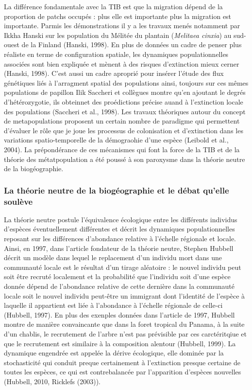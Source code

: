La différence fondamentale avec la TIB est que la migration dépend de la
proportion de patchs occupés : plus elle est importante plus la
migration est importante. Parmis les démonstrations il y a les travaux
menés notamment par Ikkha Hanski sur les population du Mélitée du
plantain (\emph{Melitaea cinxia}) au sud-ouest de la Finland (Hanski,
1998). En plus de données un cadre de penser plus réaliste en terme de
configuration spatiale, les dynamiques populationnelles associées sont
bien expliquée et mènent à des risques d'extinction mieux cerner
(Hanski, 1998). C'est aussi un cadre aproprié pour insérer l'étude des
flux génétiques liés à l'arragment spatial des populations ainsi,
toujours sur ces mêmes populations de papillon Ilik Saccheri et
collègues montre qu'en ajoutant le degrés d'hétérozygotie, ils obteinnet
des proédictions précise auand à l'extinction locale des populations
(Saccheri et al., 1998). Les travaux théoriques autour du concept de
metapopulations proposent un certain nombre de paradigme qui permettent
d'évaluer le rôle que je joue les processus de colonisation et
d'extinction dans les variations spatio-temporelle de la démograohie
d'une espèce (Leibold et al., 2004). La prépondérance de ces mécanismes
qui font la force de la TIB et de la théorie des métatpopulation a été
poussé à son paroxysme dans la théorie neutre de la biogéographie.

\subsubsection*{La théorie neutre de la biogéographie et le débat
qu'elle
soulève}\label{la-thuxe9orie-neutre-de-la-bioguxe9ographie-et-le-duxe9bat-quelle-souluxe8ve}

La théorie neutre postule l'équivalence écologique entre les différents
individus d'espèces éventuellement différentes et décrit les dynamiques
populationnelles reposant sur les différences d'abondance relative à
l'échelle régionale et locale. Ainsi, en 1997, dans l'article fondateur
de la théorie neutre, Stephen Hubbell décrit un modèle dans lequel le
replacement d'un individu mort dans une communauté locale est le
résultat d'un tirage aléatoire : le nouvel individu peut soit être
recruté localement et la probabilité que l'individu soit d'une espèce
donnée dépend de l'abondance relative de cette dernière dans la
communauté locale soit le nouvel individu peut-être un immigrant dont
l'identité de l'espèce à laquelle il appartient est liée à l'abondance à
l'échelle régionale de celle-ci (Hubbell, 1997). En plus des exenples
données dans l'article de 1997, Hubbell montre de manière convaincante
que dans la foret tropical du Panama, à la suite d'un chablis, le
recrutement de l'arbre n'est pas prévisible par ces carctéritqiue et que
le recrutement est similaire à la composition alentour (Hubbell, 1999).
La dynamique engendrée est appelée la dérive écologique, elle dominée
par la stochasticité qui conduit preque certainement à l'extinction
presque certaine de toutes les espèces, ce qui est contrebalancée par
l'apparition d'espèces nouvelles (Hubbell, 2010, Ricklefs (2003)).


